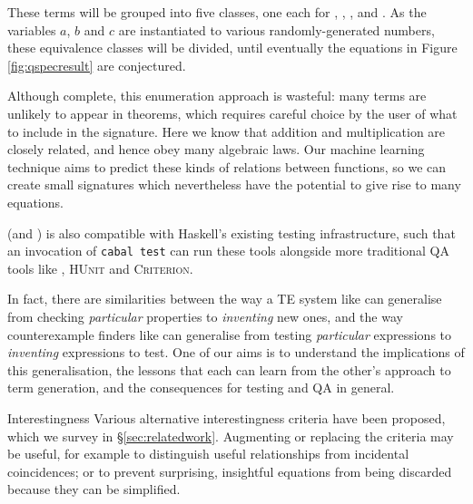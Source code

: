 These terms will be grouped into five classes, one each for ,
, ,  and . As the
variables $a$, $b$ and $c$ are instantiated to various randomly-generated
numbers, these equivalence classes will be divided, until eventually the
equations in Figure \ref{fig:qspecresult} are conjectured.

Although complete, this enumeration approach is wasteful: many terms are
unlikely to appear in theorems, which requires careful choice by the user of
what to include in the signature. Here we know that addition and multiplication
are closely related, and hence obey many algebraic laws. Our machine learning
technique aims to predict these kinds of relations between functions, so we can
create small signatures which nevertheless have the potential to give rise to
many equations.

\qspec{} (and \hspec{}) is also compatible with Haskell's existing testing
infrastructure, such that an invocation of \texttt{cabal test} can run these
tools alongside more traditional QA tools like \qcheck{}, \textsc{HUnit} and
\textsc{Criterion}.

In fact, there are similarities between the way a TE system like \qspec{} can
generalise from checking \emph{particular} properties to \emph{inventing} new
ones, and the way counterexample finders like \qcheck{} can generalise from
testing \emph{particular} expressions to \emph{inventing} expressions to
test. One of our aims is to understand the implications of this generalisation,
the lessons that each can learn from the other's approach to term generation,
and the consequences for testing and QA in general.



\begin{description}
\item{Interestingness} Various alternative interestingness criteria have been
  proposed, which we survey in \S \ref{sec:relatedwork}. Augmenting or replacing
  the criteria may be useful, for example to distinguish useful relationships
  from incidental coincidences; or to prevent surprising, insightful equations
  from being discarded because they can be simplified.
\end{description}



